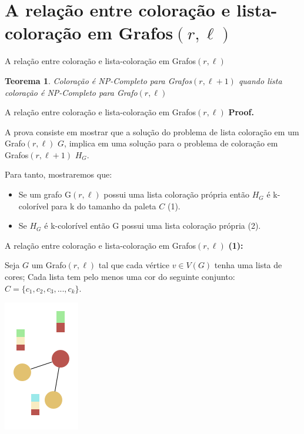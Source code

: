 \documentclass[9pt, compress]{beamer}
\newtheorem{teorema}{Teorema}
\begin{document}
    \section{A relação entre coloração e lista-coloração em Grafos$(r,\ell)$}
    \begin{frame}{A relação entre coloração e lista-coloração em Grafos$(r,\ell)$}
        \begin{teorema}
          Coloração é NP-Completo para Grafos$(r,\ell+1)$ quando lista coloração é NP-Completo para Grafo$(r,\ell)$
        \end{teorema}
    \end{frame}
    \begin{frame}{A relação entre coloração e lista-coloração em Grafos$(r,\ell)$}
        \textbf{Proof.}
        
        A prova consiste em mostrar que a solução do problema de lista coloração em um Grafo$(r,\ell)$ $G$, implica em uma solução para o problema de coloração em Grafos$(r,\ell+1)$ $H_G$.
        
        Para tanto, mostraremos que:
          \begin{itemize}
        \item Se um grafo G$(r,\ell)$ possui uma lista coloração própria então $H_G$ é k-colorível para k do tamanho da paleta $C$ (1).
		\item Se $H_G$ é k-colorível então G possui uma lista coloração própria (2).
      \end{itemize}
    \end{frame}
    \begin{frame}{A relação entre coloração e lista-coloração em Grafos$(r,\ell)$}
      \textbf{(1):}
      
      Seja $G$ um Grafo$(r,\ell)$ tal que cada vértice $v \in V(G)$ tenha uma lista de cores; 
      Cada lista tem pelo menos uma cor do seguinte conjunto: $C = \{c_1,c_2,c_3,...,c_k \}$. 
      \begin{center}
        \includegraphics[scale=0.4]{../figuras/presentation-G.png}
      \end{center}
    \end{frame}
\end{document}

